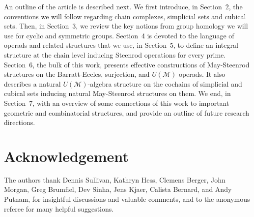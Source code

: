 An outline of the article is described next.
We first introduce, in Section~2, the conventions we will follow regarding chain complexes, simplicial sets and cubical sets.
Then, in Section~3, we review the key notions from group homology we will use for cyclic and symmetric groups. Section~4 is devoted to the language of operads and related structures that we use, in Section~5, to define an integral structure at the chain level inducing Steenrod operations for every prime. Section~6, the bulk of this work, presents effective constructions of May-Steenrod structures on the Barratt-Eccles, surjection, and $U(\mathcal M)$ operads.
It also describes a natural $U(\mathcal M)$-algebra structure on the cochains of simplicial and cubical sets inducing natural May-Steenrod structures on them.
We end, in Section~7, with an overview of some connections of this work to important geometric and combinatorial structures, and provide an outline of future research directions.

\section*{Acknowledgement}

The authors thank Dennis Sullivan, Kathryn Hess, Clemens Berger, John Morgan, Greg Brumfiel, Dev Sinha, Jens Kjaer, Calista Bernard, and Andy Putnam, for insightful discussions and valuable comments, and to the anonymous referee for many helpful suggestions.
